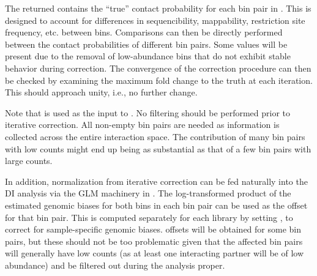 \documentclass{report}\usepackage[]{graphicx}\usepackage[usenames,dvipsnames]{color}
\newcommand{\hlopt}[1]{\textcolor[rgb]{0,0,0}{#1}}%
\newcommand{\hlstd}[1]{\textcolor[rgb]{0.251,0.251,0.251}{#1}}%
\newenvironment{knitrout}{}{} %
\begin{document}
The returned  contains the ``true'' contact probability for each bin pair in .
This is designed to account for differences in sequencibility, mappability, restriction site frequency, etc. between bins.
Comparisons can then be directly performed between the contact probabilities of different bin pairs.
Some  values will be present due to the removal of low-abundance bins that do not exhibit stable behavior during correction.
The convergence of the correction procedure can then be checked by examining the maximum fold change to the truth at each iteration.
This should approach unity, i.e., no further change.

\begin{knitrout}
\color{fgcolor}
\end{knitrout}

Note that  is used as the input to .
No filtering should be performed prior to iterative correction.
All non-empty bin pairs are needed as information is collected across the entire interaction space.
The contribution of many bin pairs with low counts might end up being as substantial as that of a few bin pairs with large counts.

In addition, normalization from iterative correction can be fed naturally into the DI analysis via the GLM machinery in .
The log-transformed product of the estimated genomic biases for both bins in each bin pair can be used as the offset for that bin pair.
This is computed separately for each library by setting , to correct for sample-specific genomic biases.
 offsets will be obtained for some bin pairs, but these should not be too problematic given that the affected bin pairs will generally have low counts (as at least one interacting partner will be of low abundance) and be filtered out during the analysis proper.
\end{document}
